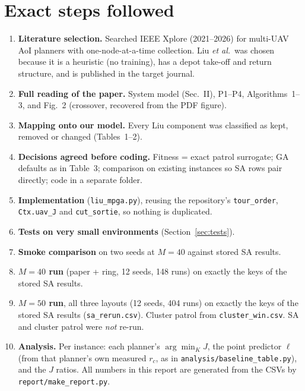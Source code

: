 \documentclass[10pt,a4paper]{article}
\begin{document}
\section{Exact steps followed}
\begin{enumerate}
\item \textbf{Literature selection.} Searched IEEE Xplore (2021--2026) for multi-UAV AoI planners with
  one-node-at-a-time collection. Liu \emph{et al.}\ was chosen because it is a heuristic (no training),
  has a depot take-off and return structure, and is published in the target journal.
\item \textbf{Full reading of the paper.} System model (Sec.~II), P1--P4, Algorithms~1--3, and Fig.~2
  (crossover, recovered from the PDF figure).
\item \textbf{Mapping onto our model.} Every Liu component was classified as kept, removed or changed
  (Tables~1--2).
\item \textbf{Decisions agreed before coding.} Fitness = exact patrol surrogate; GA defaults as in
  Table~3; comparison on existing instances so SA rows pair directly; code in a separate folder.
\item \textbf{Implementation} (\texttt{liu\_mpga.py}), reusing the repository's \texttt{tour\_order},
  \texttt{Ctx.uav\_J} and \texttt{cut\_sortie}, so nothing is duplicated.
\item \textbf{Tests on very small environments} (Section~\ref{sec:tests}).
\item \textbf{Smoke comparison} on two seeds at $M=40$ against stored SA results.
\item \textbf{$M=40$ run} (paper + ring, 12 seeds, 148 runs) on exactly the keys of the stored SA results.
\item \textbf{$M=50$ run}, all three layouts (12 seeds, 404 runs) on exactly the keys of the stored SA
  results (\texttt{sa\_rerun.csv}). Cluster patrol from \texttt{cluster\_win.csv}. SA and cluster patrol
  were \emph{not} re-run.
\item \textbf{Analysis.} Per instance: each planner's $\arg\min_K J$, the point predictor $\ell$ (from that
  planner's own measured $r_c$, as in \texttt{analysis/baseline\_table.py}), and the $J$ ratios. All
  numbers in this report are generated from the CSVs by \texttt{report/make\_report.py}.
\end{enumerate}
\end{document}
